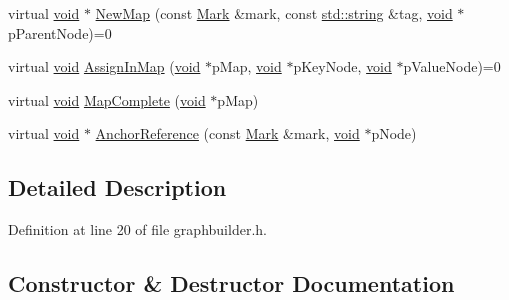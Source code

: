 \begin{DoxyCompactItemize}
\item 
virtual \mbox{\hyperlink{glad_8h_a950fc91edb4504f62f1c577bf4727c29}{void}} $\ast$ \mbox{\hyperlink{class_y_a_m_l_1_1_graph_builder_interface_ac90052647ba4db8536e3e457d7bb7489}{New\+Map}} (const \mbox{\hyperlink{struct_y_a_m_l_1_1_mark}{Mark}} \&mark, const \mbox{\hyperlink{glad_8h_ac83513893df92266f79a515488701770}{std\+::string}} \&tag, \mbox{\hyperlink{glad_8h_a950fc91edb4504f62f1c577bf4727c29}{void}} $\ast$p\+Parent\+Node)=0
\item 
virtual \mbox{\hyperlink{glad_8h_a950fc91edb4504f62f1c577bf4727c29}{void}} \mbox{\hyperlink{class_y_a_m_l_1_1_graph_builder_interface_a11538cc1796ebac94c10e0a3bab4b746}{Assign\+In\+Map}} (\mbox{\hyperlink{glad_8h_a950fc91edb4504f62f1c577bf4727c29}{void}} $\ast$p\+Map, \mbox{\hyperlink{glad_8h_a950fc91edb4504f62f1c577bf4727c29}{void}} $\ast$p\+Key\+Node, \mbox{\hyperlink{glad_8h_a950fc91edb4504f62f1c577bf4727c29}{void}} $\ast$p\+Value\+Node)=0
\item 
virtual \mbox{\hyperlink{glad_8h_a950fc91edb4504f62f1c577bf4727c29}{void}} \mbox{\hyperlink{class_y_a_m_l_1_1_graph_builder_interface_ae572063ef5c737705e2f75340b116766}{Map\+Complete}} (\mbox{\hyperlink{glad_8h_a950fc91edb4504f62f1c577bf4727c29}{void}} $\ast$p\+Map)
\item 
virtual \mbox{\hyperlink{glad_8h_a950fc91edb4504f62f1c577bf4727c29}{void}} $\ast$ \mbox{\hyperlink{class_y_a_m_l_1_1_graph_builder_interface_ab742307ea6e415387e21265ea311c4b0}{Anchor\+Reference}} (const \mbox{\hyperlink{struct_y_a_m_l_1_1_mark}{Mark}} \&mark, \mbox{\hyperlink{glad_8h_a950fc91edb4504f62f1c577bf4727c29}{void}} $\ast$p\+Node)
\end{DoxyCompactItemize}


\subsection{Detailed Description}


Definition at line 20 of file graphbuilder.\+h.



\subsection{Constructor \& Destructor Documentation}
\mbox{\label{class_y_a_m_l_1_1_graph_builder_interface_a8324da040e5753226f25e7c95e9cd060}} 
